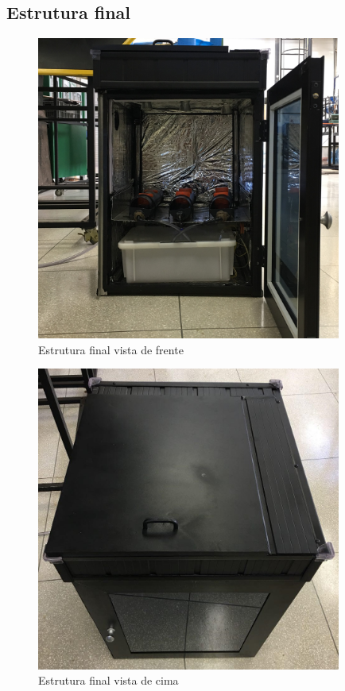 \subsection{Estrutura final}
\begin{figure}[!htb]
	\centering
	\includegraphics[width=10cm]{figuras/estufapreta_frente.JPG}
	\caption{Estrutura final vista de frente}
	\label{fig:estufapreta_frente}
\end{figure}
\begin{figure}[!htb]
	\centering
	\includegraphics[width=10cm]{figuras/estufapreta_cima.jpg}
	\caption{Estrutura final vista de cima}
	\label{fig:estufapreta_cima}
\end{figure}
